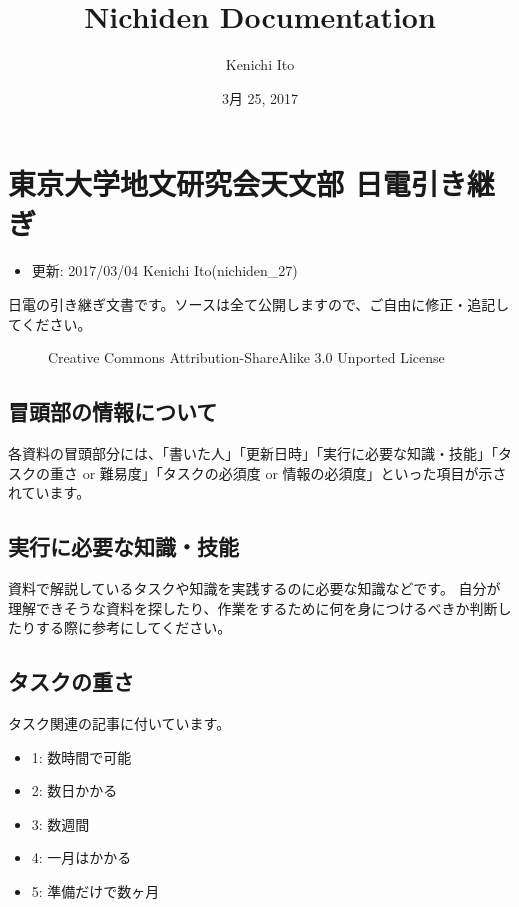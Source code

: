 \documentclass[letterpaper,10pt,dvipdfmx]{sphinxmanual}
\title{Nichiden Documentation}
\date{3月 25, 2017}
\author{Kenichi Ito}
\begin{document}
\maketitle
\sphinxtableofcontents
{}\label{\detokenize{index::doc}}



\chapter{東京大学地文研究会天文部 日電引き継ぎ}
\label{\detokenize{main::doc}}\label{\detokenize{main:id1}}\begin{itemize}
\item {} 
更新: 2017/03/04 Kenichi Ito(nichiden\_27)

\end{itemize}

日電の引き継ぎ文書です。ソースは全て公開しますので、ご自由に修正・追記してください。
\begin{figure}[htbp]
\centering
\capstart

\noindent{}
\caption{Creative Commons Attribution-ShareAlike 3.0 Unported License}\label{\detokenize{main:id8}}\end{figure}


\section{冒頭部の情報について}
\label{\detokenize{main:id2}}
各資料の冒頭部分には、「書いた人」「更新日時」「実行に必要な知識・技能」「タスクの重さ
or 難易度」「タスクの必須度 or
情報の必須度」といった項目が示されています。


\section{実行に必要な知識・技能}
\label{\detokenize{main:id3}}
資料で解説しているタスクや知識を実践するのに必要な知識などです。
自分が理解できそうな資料を探したり、作業をするために何を身につけるべきか判断したりする際に参考にしてください。


\section{タスクの重さ}
\label{\detokenize{main:id4}}
タスク関連の記事に付いています。
\begin{itemize}
\item {} 
1: 数時間で可能

\item {} 
2: 数日かかる

\item {} 
3: 数週間

\item {} 
4: 一月はかかる

\item {} 
5: 準備だけで数ヶ月

\end{itemize}
\end{document}
